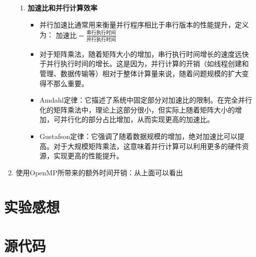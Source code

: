 \documentclass{article}
\begin{document}
\begin{enumerate}
\begin{enumerate}
        \item \textbf{加速比和并行计算效率}
        \begin{itemize}
          \item 并行加速比通常用来衡量并行程序相比于串行版本的性能提升，定义为：
          $ 加速比 = \frac{串行执行时间}{并行执行时间} $
          \item 对于矩阵乘法，随着矩阵大小的增加，串行执行时间增长的速度远快于并行执行时间的增长。这是因为，并行计算的开销（如线程创建和管理、数据传输等）相对于整体计算量来说，随着问题规模的扩大变得不那么重要。
          \item Amdahl定律：它描述了系统中固定部分对加速比的限制。在完全并行化的矩阵乘法中，理论上这部分很小，但实际上随着矩阵大小的增加，可并行化的部分占比增加，从而实现更高的加速比。
          \item Gustafson定律：它强调了随着数据规模的增加，绝对加速比可以提高。对于大规模矩阵乘法，这意味着并行计算可以利用更多的硬件资源，实现更高的性能提升。
        \end{itemize}
      \end{enumerate}
      \item 使用OpenMP所带来的额外时间开销：从上面可以看出
\end{enumerate}

\section{实验感想}

\newpage
\appendix
\section{源代码}
\end{document}
